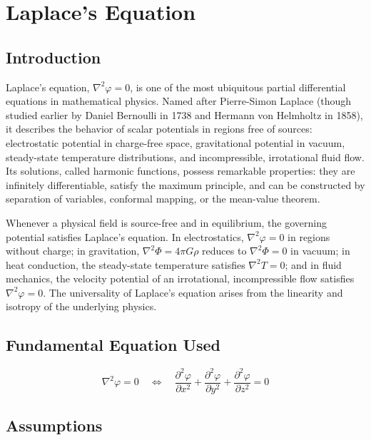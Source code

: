 \chapter{Laplace's Equation}

\section*{Introduction}

Laplace's equation, $\nabla^{2}\varphi = 0$, is one of the most ubiquitous partial differential equations in mathematical physics. Named after Pierre-Simon Laplace (though studied earlier by Daniel Bernoulli in 1738 and Hermann von Helmholtz in 1858), it describes the behavior of scalar potentials in regions free of sources: electrostatic potential in charge-free space, gravitational potential in vacuum, steady-state temperature distributions, and incompressible, irrotational fluid flow. Its solutions, called harmonic functions, possess remarkable properties: they are infinitely differentiable, satisfy the maximum principle, and can be constructed by separation of variables, conformal mapping, or the mean-value theorem.

Whenever a physical field is source-free and in equilibrium, the governing potential satisfies Laplace's equation. In electrostatics, $\nabla^{2}\varphi = 0$ in regions without charge; in gravitation, $\nabla^{2}\Phi = 4\pi G\rho$ reduces to $\nabla^{2}\Phi = 0$ in vacuum; in heat conduction, the steady-state temperature satisfies $\nabla^{2}T = 0$; and in fluid mechanics, the velocity potential of an irrotational, incompressible flow satisfies $\nabla^{2}\varphi = 0$. The universality of Laplace's equation arises from the linearity and isotropy of the underlying physics.
\section*{Fundamental Equation Used}

\begin{equation}
\boxed{\; \nabla^{2}\varphi = 0 \quad\Longleftrightarrow\quad \frac{\partial^{2}\varphi}{\partial x^{2}} + \frac{\partial^{2}\varphi}{\partial y^{2}} + \frac{\partial^{2}\varphi}{\partial z^{2}} = 0\;}
\label{eq:laplace}
\end{equation}
\section*{Assumptions}

